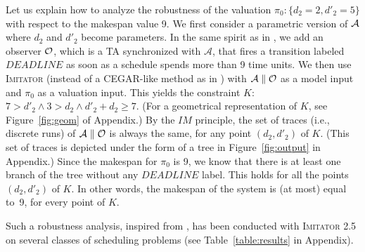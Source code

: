 \documentclass{llncs}
\newcommand{\A}{\mathcal{A}}
\newcommand{\Ko}{K}
\newcommand{\pio}{\pi_0}
\newcommand{\IM}{\mathit{IM}}
\newcommand{\imitator}{\textsc{Imitator}}
\begin{document}
Let us explain how to analyze the robustness of the
valuation $\pio:\{d_2=2,d'_2=5\}$ with respect to the makespan value 9.
We first consider a parametric version of ${\cal A}$ where
$d_2$ and $d'_2$ become parameters.
In the same spirit as in \cite{cpr08},
we add an observer ${\cal O}$, which is a TA
synchronized with $\A$, that fires a transition labeled $\mathit{DEADLINE}$ as soon as a schedule spends more than 9 time units.
We then use \imitator{} (instead of a CEGAR-like method
as in \cite{cpr08}) with $\A \parallel {\cal O}$ as a model input
and $\pio$ as a valuation input.
This yields the constraint $\Ko$:  $7 > d'_2 \wedge 3 > d_2 \wedge d'_2 + d_2 \geq 7$.
(For a geometrical representation of $\Ko$, see Figure~\ref{fig:geom} of Appendix.)
By the $\IM$ principle, the set of traces (i.e., discrete runs) of
$\A \parallel {\cal O}$ is always the same,
for any point $(d_2,d'_2)$ of $\Ko$.
(This set of traces is depicted under the form of a tree in Figure~\ref{fig:output} in Appendix.)
Since the makespan for $\pio$ is 9,
we know that there is at least one branch of the tree without
any $\mathit{DEADLINE}$ label.
This holds for all the points $(d_2,d'_2)$ of $\Ko$.
In other words, the makespan of the system is  (at most) equal to~9, for every point of $\Ko$. 

Such a robustness analysis, inspired from \cite{cpr08}, 
has been conducted with \imitator{} 2.5
on several classes of scheduling problems (see Table~\ref{table:results} in Appendix).
\end{document}
